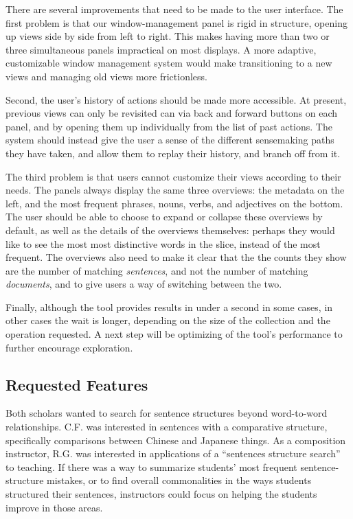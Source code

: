 \documentclass{sig-alternate}
\begin{document}
There are several improvements that need to be made to the user interface. The first problem is that our window-management panel is rigid in structure, opening up views side by side from left to right. This makes having more than two or three simultaneous panels impractical on most displays. A more adaptive, customizable window management system would make transitioning to a new views and managing old views more frictionless.

Second, the user's history of actions should be made more accessible. At present, previous views can only be revisited can via back and forward buttons on each panel, and by opening them up individually from the list of past actions. The system should instead give the user a sense of the different sensemaking paths they have taken, and allow them to replay their history, and branch off from it.

The third problem is that users cannot customize their views according to their needs. The panels always display the same three overviews: the metadata on the left, and the most frequent phrases, nouns, verbs, and adjectives on the bottom. The user should be able to choose to expand or collapse these overviews by default, as well as the details of the overviews themselves: perhaps they would like to see the most most distinctive words in the slice, instead of the most frequent. The overviews also need to make it clear that the the counts they show are the number of matching \emph{sentences}, and not the number of matching \emph{documents}, and to give users a way of switching between the two.

Finally, although the tool provides results in under a second in some cases, in other cases the wait is longer, depending on the size of the collection and the operation requested.  A next step will be optimizing of the tool's performance to further encourage exploration. 
 
 \subsection{Requested Features}
 Both scholars wanted to search for sentence structures beyond word-to-word relationships. C.F. was interested in sentences with a comparative structure, specifically comparisons between  Chinese and Japanese things. As a composition instructor, R.G. was interested in applications of a ``sentences structure search'' to teaching.  If there was a way to summarize students' most frequent sentence-structure mistakes, or to find overall commonalities in the ways students structured their sentences, instructors could focus on helping the students improve in those areas.
 
\end{document}
